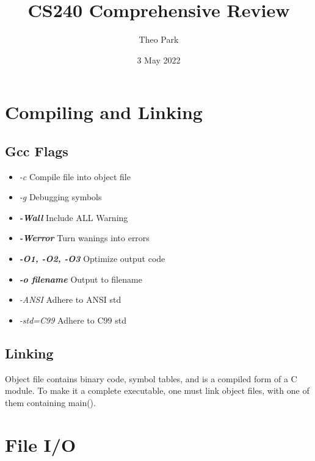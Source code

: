 \documentclass{article}
\title{CS240 Comprehensive Review}
\author{Theo Park}
\date{3 May 2022}
\begin{document}
\maketitle

\section{Compiling and Linking}

\subsection{Gcc Flags}
\begin{itemize}
    \item \textit{-c} Compile file into object file
    \item \textit{-g} Debugging symbols
    \item \textbf{\textit{-Wall}} Include ALL Warning
    \item \textbf{\textit{-Werror}} Turn wanings into errors
    \item \textbf{\textit{-O1, -O2, -O3}} Optimize output code
    \item \textbf{\textit{-o filename}} Output to filename
    \item \textit{-ANSI} Adhere to ANSI std
    \item \textit{-std=C99} Adhere to C99 std
\end{itemize}

\subsection{Linking}
Object file contains binary code, symbol tables, and is a compiled form of a C module.
To make it a complete executable, one must link object files, with one of them containing main().

\section{File I/O}
\end{document}
